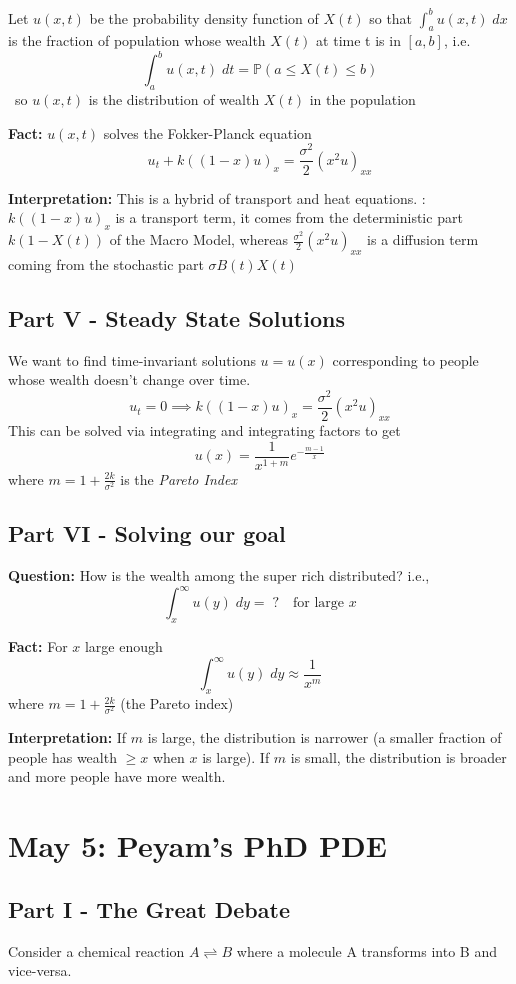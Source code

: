 \documentclass[12pt]{article}
\begin{document}
Let $u(x, t)$ be the probability density function of $X(t)$ so that $\int_a^b u(x, t)\; dx$ is the fraction of population whose wealth $X(t)$ at time t is in $[a, b]$, i.e.
\[\int_a^b u(x, t) \; dt = \mathbb{P}(a \leq X(t) \leq b)\]\
so $u(x, t)$ is the distribution of wealth $X(t)$ in the population 

\textbf{Fact:} $u(x, t)$ solves the Fokker-Planck equation
\[\boxed{u_t + k((1 - x)u)_x = \frac{\sigma^2}{2}(x^2u)_{xx}}\]

\textbf{Interpretation:} This is a hybrid of transport and heat equations. : $k((1 - x)u)_x$ is a transport term, it comes from the deterministic part $k(1-X(t))$ of the Macro Model, whereas $\frac{\sigma^2}{2}(x^2u)_{xx}$ is a diffusion term coming from the stochastic part $\sigma B(t)X(t)$

\subsection*{Part V - Steady State Solutions}
We want to find time-invariant solutions $u = u(x)$ corresponding to people whose wealth doesn't change over time. 
\[u_t = 0 \implies k((1 - x)u)_x = \frac{\sigma^2}{2}(x^2 u)_{xx}\]
This can be solved via integrating and integrating factors to get 
\[u(x) = \frac{1}{x^{1 +m}}e^{-\frac{m - 1}{x}}\]
where $m = 1 + \frac{2k}{\sigma^2}$ is the \emph{Pareto Index}

\subsection*{Part VI - Solving our goal}
\textbf{Question:} How is the wealth among the super rich distributed? i.e.,
\[\int_x^\infty u(y)\; dy =\; ? \quad \text{for large } x\]

\textbf{Fact:} For $x$ large enough 
\[\int_x^\infty u(y)\; dy \approx \frac{1}{x^m}\]
where $m = 1 + \frac{2k}{\sigma^2}$ (the Pareto index)

\textbf{Interpretation:} If $m$ is large, the distribution is narrower (a smaller fraction of people has wealth $\geq x$ when $x$ is large). If $m$ is small, the distribution is broader and more people have more wealth.

\section{May 5: Peyam's PhD PDE}
\subsection*{Part I - The Great Debate}
Consider a chemical reaction $A \rightleftharpoons B$ where a molecule A transforms into B and vice-versa. 
\end{document}
